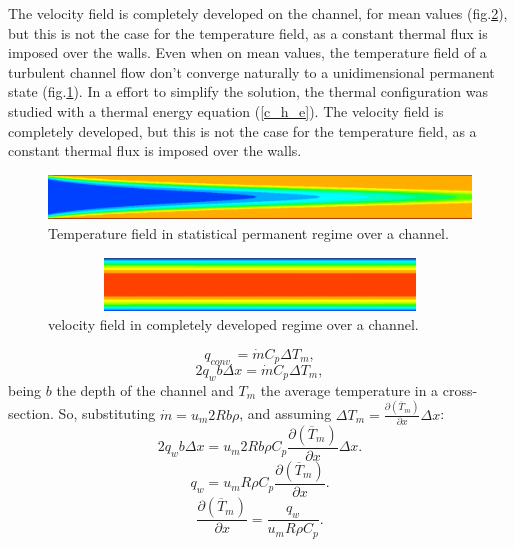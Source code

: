 \documentclass[10pt]{article} %
\begin{document}
The velocity field is completely developed on the channel, for mean values (fig.\ref{figure.3}), but this is not the case for the temperature field, as a constant thermal flux is imposed over the walls.
Even when on mean values, the temperature field of a turbulent channel flow don't converge naturally to a unidimensional permanent state (fig.\ref{figure.2}). In a effort to simplify the solution, the thermal configuration was studied with a thermal energy equation (\ref{c_h_e}).
The velocity field is completely developed, but this is not the case for the temperature field, as a constant thermal flux is imposed over the walls.
\begin{figure}[h!]
	\centering
	\includegraphics[angle=0, scale=0.40]{fotos_formatacao_final/temperatura}
	\caption{Temperature field in statistical permanent regime over a channel.}
	\label{figure.2}
\end{figure}
\begin{figure}[h!]
	\centering
	\includegraphics[angle=0, height=1.4cm , width=12.3cm]{fotos_formatacao_final/velocidade}
	\caption{velocity field in completely developed regime over a channel.}
	\label{figure.3}
\end{figure}
\begin{equation}\label{c_h_e}
q_{conv.} = \dot{m} C_p \Delta T_m,
\end{equation}
\begin{equation}
2q_w b \Delta x = \dot{m} C_p \Delta T_m,
\end{equation}
being $b$ the depth of the channel and $T_m$ the average temperature in a cross-section. So, substituting $ \dot{m} = u_m 2R b \rho $, and assuming $ \Delta T_m = \frac{\partial{\left(\overline{T}_m\right)}}{\partial{x}} \Delta x $:
\begin{equation}
2q_w b \Delta x = u_m 2R b \rho  C_p \frac{\partial{\left(\overline{T}_m\right)}}{\partial{x}} \Delta x.
\end{equation}     
\begin{equation}
q_w = u_m R \rho  C_p \frac{\partial{\left(\overline{T}_m\right)}}{\partial{x}} .
\end{equation} 
\begin{equation}\label{c_h_ee}
\frac{\partial{\left(\overline{T}_m\right)}}{\partial{x}} = \frac{q_w}{u_m  R \rho  C_p } .
\end{equation} 
\end{document}

